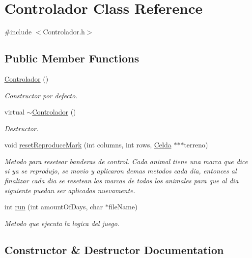 \hypertarget{classControlador}{}\section{Controlador Class Reference}
\label{classControlador}


{\ttfamily \#include $<$Controlador.\+h$>$}

\subsection*{Public Member Functions}
\begin{DoxyCompactItemize}
\item 
\hyperlink{classControlador_a17db08229680461d4d1a2110a92ccf78}{Controlador} ()
\begin{DoxyCompactList}\small\item\em Constructor por defecto. \end{DoxyCompactList}\item 
virtual \hyperlink{classControlador_a2f1828135645f009d3772de86f12d507}{$\sim$\+Controlador} ()
\begin{DoxyCompactList}\small\item\em Destructor. \end{DoxyCompactList}\item 
void \hyperlink{classControlador_ae18001a1939880c3600e323ef4177e3a}{reset\+Reproduce\+Mark} (int columns, int rows, \hyperlink{classCelda}{Celda} $\ast$$\ast$$\ast$terreno)
\begin{DoxyCompactList}\small\item\em Metodo para resetear banderas de control. Cada animal tiene una marca que dice si ya se reprodujo, se movio y aplicaron demas metodos cada dia, entonces al finalizar cada dia se resetean las marcas de todos los animales para que al dia siguiente puedan ser aplicadas nuevamente. \end{DoxyCompactList}\item 
int \hyperlink{classControlador_a33ea3e8f5c32cd2fcd962da6e7fadf52}{run} (int amount\+Of\+Days, char $\ast$file\+Name)
\begin{DoxyCompactList}\small\item\em Metodo que ejecuta la logica del juego. \end{DoxyCompactList}\end{DoxyCompactItemize}


\subsection{Constructor \& Destructor Documentation}
